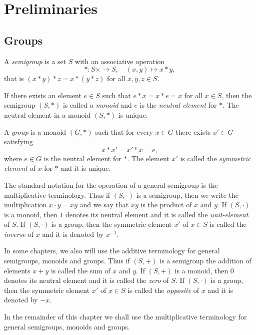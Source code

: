 \chapter{Preliminaries}
\label{preliminaries}


\section{Groups}

A {\em semigroup} is a set $S$ with an associative operation
\[ 
*\colon S\times \longrightarrow S, 
\quad
(x,y)\mapsto x*y,
\]
that is $(x*y)*z=x*(y*z)$ for all $x,y,z\in S$.

If there exists an element $e\in S$ such that $e*x=x*e=x$ for all $x\in S$, then 
the semigroup $(S,*)$ is called a {\em monoid} and $e$ is the {\em neutral element} for $*$. 
The neutral element in a monoid $(S,*)$ is unique.

A {\em group} is a monoid $(G,*)$ such that for every $x\in G$ there exists $x'\in G$ satisfying
\[ 
x*x'=x'*x=e,
\]
where $e\in G$ is the neutral element for $*$. The element $x'$ is called 
the {\em symmetric element} of $x$ for $*$ and it is unique.

The standard notation for the operation of a general semigroup is the multiplicative terminology. 
Thus if $(S,\cdot)$ is a semigroup, then we write the multiplication  $x\cdot y=xy$  
and we say that $xy$ is the product of $x$ and $y$. If $(S,\cdot)$  is a monoid, 
then $1$ denotes its neutral element and it is called the {\em unit-element} of $S$. 
If $(S,\cdot)$ is a group, then the symmetric element $x'$ of $x\in S$ is called the {\em inverse} 
of $x$ and it is denoted by $x^{-1}$.

In some chapters, we also will use the additive terminology for general semigroups, monoids and groups. 
Thus if $(S,+)$ is a semigroup the addition of elements $x+y$ is called the sum of $x$ and $y$. If $(S,+)$ 
is a monoid, then $0$ denotes its neutral element and it is called the {\em zero} of $S$. 
If $(S,\cdot)$ is a group, then the symmetric element $x'$ of $x\in S$ is called the {\em opposite} of $x$ and it is denoted by $-x$.

In the remainder of this chapter we shall use the multiplicative terminology for general semigroups, monoids and groups.

